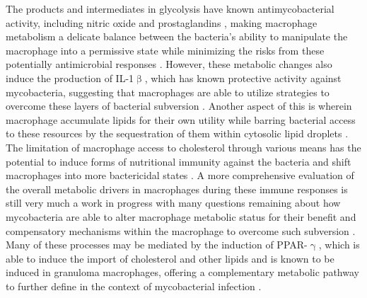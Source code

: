 The products and intermediates in glycolysis have known antimycobacterial activity, including nitric oxide and prostaglandins \citep{MacMicking1997b, MayerBarber2014}, making macrophage metabolism a delicate balance between the bacteria's ability to manipulate the macrophage into a permissive state while minimizing the risks from these potentially antimicrobial responses \citep{OsadaOka2019}. However, these metabolic changes also induce the production of IL\hyp{}1$\upbeta$, which has known protective activity against mycobacteria, suggesting that macrophages are able to utilize strategies to overcome these layers of bacterial subversion \citep{Corcoran2016, Ogryzko2019, Fremond2007, Shi2019, Juffermans2000}. Another aspect of this is wherein macrophage accumulate lipids for their own utility while barring bacterial access to these resources by the sequestration of them within cytosolic lipid droplets \citep{Laval2021, Knight2018}. The limitation of macrophage access to cholesterol through various means has the potential to induce forms of nutritional immunity against the bacteria and shift macrophages into more bactericidal states \citep{Babunovic2022, Pandey2008, Yang2014c}. A more comprehensive evaluation of the overall metabolic drivers in macrophages during these immune responses is still very much a work in progress with many questions remaining about how mycobacteria are able to alter macrophage metabolic status for their benefit and compensatory mechanisms within the macrophage to overcome such subversion \citep{Pagan2022}. Many of these processes may be mediated by the induction of PPAR\hyp{}$\upgamma$, which is able to induce the import of cholesterol and other lipids and is known to be induced in granuloma macrophages, offering a complementary metabolic pathway to further define in the context of mycobacterial infection \citep{Chawla2001}.

